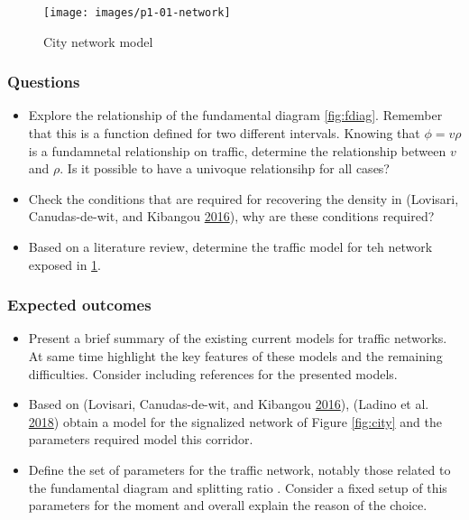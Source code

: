 \documentclass[]{book}
\providecommand{\tightlist}{%
  \setlength{\itemsep}{0pt}\setlength{\parskip}{0pt}}
\theoremstyle{definition}
\theoremstyle{definition}
\theoremstyle{definition}
\theoremstyle{remark}
\begin{document}
\begin{figure}

{\centering \texttt{[image: images/p1-01-network]} 

}

\caption{City network model}\label{fig:citynet}
\end{figure}

\hypertarget{questions-8}{%
\subsubsection*{Questions}\label{questions-8}}

\begin{itemize}
\tightlist
\item
  Explore the relationship of the fundamental diagram \ref{fig:fdiag}.
  Remember that this is a function defined for two different intervals.
  Knowing that \(\phi = v\rho\) is a fundamnetal relationship on
  traffic, determine the relationship between \(v\) and \(\rho\). Is it
  possible to have a univoque relationsihp for all cases?
\item
  Check the conditions that are required for recovering the density in
  (Lovisari, Canudas-de-wit, and Kibangou
  \protect\hyperlink{ref-Lovisari2016}{2016}), why are these conditions
  required?
\item
  Based on a literature review, determine the traffic model for teh
  network exposed in \ref{fig:citynet}.
\end{itemize}

\hypertarget{expected-outcomes-8}{%
\subsubsection*{Expected outcomes}\label{expected-outcomes-8}}

\begin{itemize}
\item
  Present a brief summary of the existing current models for traffic
  networks. At same time highlight the key features of these models and
  the remaining difficulties. Consider including references for the
  presented models.
\item
  Based on (Lovisari, Canudas-de-wit, and Kibangou
  \protect\hyperlink{ref-Lovisari2016}{2016}), (Ladino et al.
  \protect\hyperlink{ref-Ladino2018}{2018}) obtain a model for the
  signalized network of Figure \ref{fig:city} and the parameters
  required model this corridor.
\item
  Define the set of parameters for the traffic network, notably those
  related to the fundamental diagram and splitting ratio . Consider a
  fixed setup of this parameters for the moment and overall explain the
  reason of the choice.
\end{itemize}
\end{document}

